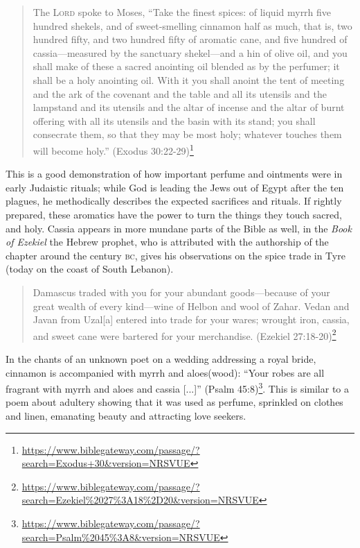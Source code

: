 \begin{quote}
     The \textsc{Lord} spoke to Moses,  ``Take the finest spices: of liquid myrrh five hundred shekels, and of sweet-smelling cinnamon half as much, that is, two hundred fifty, and two hundred fifty of aromatic cane,  and five hundred of cassia—measured by the sanctuary shekel—and a hin of olive oil,  and you shall make of these a sacred anointing oil blended as by the perfumer; it shall be a holy anointing oil.  With it you shall anoint the tent of meeting and the ark of the covenant  and the table and all its utensils and the lampstand and its utensils and the altar of incense  and the altar of burnt offering with all its utensils and the basin with its stand;  you shall consecrate them, so that they may be most holy; whatever touches them will become holy.'' (Exodus 30:22-29)\footnote{\url{https://www.biblegateway.com/passage/?search=Exodus+30&version=NRSVUE}} 
\end{quote}

This is a good demonstration of how important perfume and ointments were in early Judaistic rituals; while God is leading the Jews out of Egypt after the ten plagues, he methodically describes the expected sacrifices and rituals. If rightly prepared, these aromatics have the power to turn the things they touch sacred, and holy. Cassia appears in more mundane parts of the Bible as well, in the \textit{Book of Ezekiel} the Hebrew prophet, who is attributed with the authorship of the chapter around the  century \textsc{bc}, gives his observations on the spice trade in Tyre (today on the coast of South Lebanon).

\begin{quote}
   Damascus traded with you for your abundant goods—because of your great wealth of every kind—wine of Helbon and wool of Zahar.  Vedan and Javan from Uzal[a] entered into trade for your wares; wrought iron, cassia, and sweet cane were bartered for your merchandise. (Ezekiel 27:18-20)\footnote{\url{https://www.biblegateway.com/passage/?search=Ezekiel\%2027\%3A18\%2D20&version=NRSVUE}}
\end{quote}

In the chants of an unknown poet on a wedding addressing a royal bride, cinnamon is accompanied with myrrh and aloes(wood): ``Your robes are all fragrant with myrrh and aloes and cassia [...]'' (Psalm 45:8)\footnote{\url{https://www.biblegateway.com/passage/?search=Psalm\%2045\%3A8&version=NRSVUE}}. This is similar to a poem about adultery showing that it was used as perfume, sprinkled on clothes and linen, emanating beauty and attracting love seekers.

